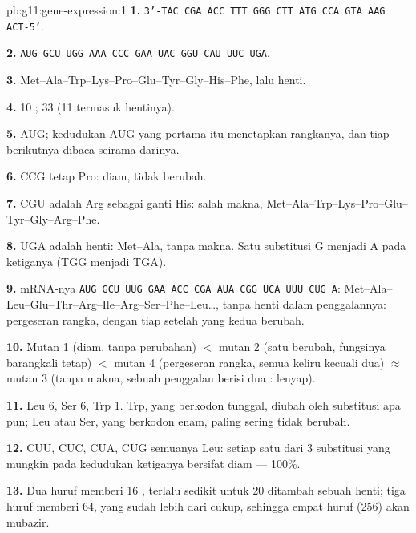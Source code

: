 \begin{solution}{pb:g11:gene-expression:1}
\textbf{1.} \texttt{3'-TAC CGA ACC TTT GGG
CTT ATG CCA GTA AAG ACT-5'}.

\textbf{2.} \texttt{AUG GCU UGG AAA CCC
GAA UAC GGU CAU UUC UGA}.

\textbf{3.} Met--Ala--Trp--Lys--Pro--Glu--Tyr--Gly--His--Phe, lalu henti.

\textbf{4.} 10 ; 33  (11  termasuk hentinya).

\textbf{5.} AUG; kedudukan AUG yang pertama itu menetapkan rangkanya,
dan tiap  berikutnya dibaca seirama darinya.

\textbf{6.} CCG tetap Pro: diam,  tidak berubah.

\textbf{7.} CGU adalah Arg sebagai ganti His: salah makna,
Met--Ala--Trp--Lys--Pro--Glu--Tyr--Gly--Arg--Phe.

\textbf{8.} UGA adalah henti: Met--Ala, tanpa makna. Satu substitusi G
menjadi A pada  ketiganya (TGG menjadi TGA).

\textbf{9.} mRNA-nya \texttt{AUG GCU UUG GAA ACC
CGA AUA CGG UCA UUU CUG A}:
Met--Ala--Leu--Glu--Thr--Arg--Ile--Arg--Ser--Phe--Leu\dots, tanpa henti
dalam penggalannya: pergeseran rangka, dengan tiap  setelah
yang kedua berubah.

\textbf{10.} Mutan 1 (diam, tanpa perubahan) $<$ mutan 2 (satu  berubah, fungsinya barangkali tetap) $<$ mutan 4 (pergeseran
rangka, semua  keliru kecuali dua) $\approx$ mutan 3
(tanpa makna, sebuah penggalan berisi dua :  lenyap).

\textbf{11.} Leu 6, Ser 6, Trp 1. Trp, yang berkodon tunggal, diubah
oleh substitusi apa pun; Leu atau Ser, yang berkodon enam, paling
sering tidak berubah.

\textbf{12.} CUU, CUC, CUA, CUG semuanya Leu: setiap satu dari 3
substitusi yang mungkin pada kedudukan ketiganya bersifat diam --- 100\%.

\textbf{13.} Dua huruf memberi 16 , terlalu sedikit untuk 20  ditambah sebuah henti; tiga huruf memberi 64, yang sudah lebih
dari cukup, sehingga empat huruf (256) akan mubazir.


\end{solution}
